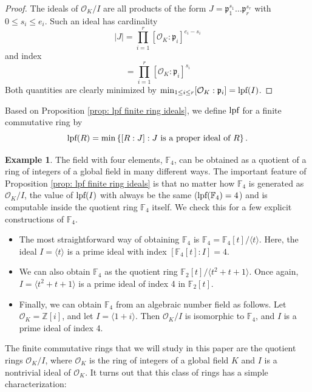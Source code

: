 \documentclass{amsart}
\theoremstyle{definition}
\newtheorem{example}[theorem]{Example}
\numberwithin{equation}{section}
\newcommand{\Z}{\mathbb{Z}}
\newcommand{\F}{\mathbb{F}}
\newcommand{\p}{\mathfrak{p}}
\newcommand{\mO}{\mathcal{O}}
\newcommand{\lpf}{\normalfont\text{lpf}}
\begin{document}
\begin{proof}
	The ideals of $\mO_K/I$ are all products of the form $J = \p_1^{s_1} \dots \p_r^{s_r}$ with $0 \le s_i \le e_i$.
	Such an ideal has cardinality
	\begin{equation*}
		|J| = \prod_{i=1}^r [\mO_K : \p_i]^{e_i - s_i}
	\end{equation*}
	and index
	\begin{equation*}
		[\mO_K/I : J] = \prod_{i=1}^r [\mO_K : \p_i]^{s_i}
	\end{equation*}
    Both quantities are clearly minimized by $\min_{1\le i \le r} [\mO_K:\p_i] = \lpf(I)$.
\end{proof}

Based on Proposition \ref{prop: lpf finite ring ideals}, we define $\lpf$ for a finite commutative ring by
\begin{equation*}
	\lpf(R) = \min \left\{  [R : J] : J~\text{is a proper ideal of}~R \right\}.
\end{equation*}

\begin{example} \label{eg: F_4 realization}
	The field with four elements, $\F_4$, can be obtained as a quotient of a ring of integers of a global field in many different ways.
	The important feature of Proposition \ref{prop: lpf finite ring ideals} is that no matter how $\F_4$ is generated as $\mO_K/I$, the value of $\lpf(I)$ with always be the same ($\lpf(\F_4) = 4$) and is computable inside the quotient ring $\F_4$ itself.
	We check this for a few explicit constructions of $\F_4$.
	
	\begin{itemize}
		\item	The most straightforward way of obtaining $\F_4$ is $\F_4 = \F_4[t]/\langle t \rangle$.
			Here, the ideal $I = \langle t \rangle$ is a prime ideal with index $[\F_4[t] : I] = 4$.
		\item	We can also obtain $\F_4$ as the quotient ring $\F_2[t]/\langle t^2 + t + 1 \rangle$.
			Once again, $I = \langle t^2 + t + 1 \rangle$ is a prime ideal of index 4 in $\F_2[t]$.
		\item	Finally, we can obtain $\F_4$ from an algebraic number field as follows.
			Let $\mO_K = \Z[i]$, and let $I = \langle 1 + i \rangle$.
			Then $\mO_K/I$ is isomorphic to $\F_4$, and $I$ is a prime ideal of index 4.
	\end{itemize}
\end{example}

The finite commutative rings that we will study in this paper are the quotient rings $\mO_K/I$, where $\mO_K$ is the ring of integers of a global field $K$ and $I$ is a nontrivial ideal of $\mO_K$.
It turns out that this class of rings has a simple characterization:
\end{document}

